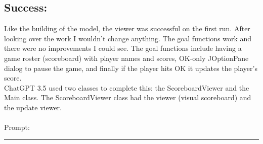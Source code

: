 \documentclass[a4paper,11pt]{article}
\begin{document}
\subsection*{Success:}
Like the building of the model, the viewer was successful on the first run. After looking over the work I wouldn't change anything. The goal functions work and there were no improvements I could see. The goal functions include having a game roster (scoreboard) with player names and scores, OK-only JOptionPane dialog to pause the game, and finally if the player hits OK it updates the player’s score. \\
ChatGPT 3.5 used two classes to complete this: the ScoreboardViewer and the Main class. The ScoreboardViewer class had the viewer (visual scoreboard) and the update viewer.\\\\
Prompt:
\hrule
\vspace{4pt} %
\end{document}
